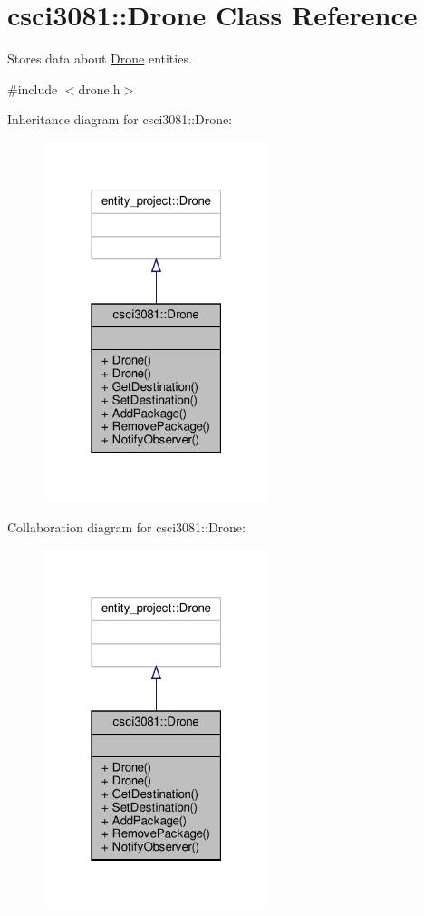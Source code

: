 \hypertarget{classcsci3081_1_1Drone}{}\section{csci3081\+:\+:Drone Class Reference}
\label{classcsci3081_1_1Drone}


Stores data about \hyperlink{classcsci3081_1_1Drone}{Drone} entities.  




{\ttfamily \#include $<$drone.\+h$>$}



Inheritance diagram for csci3081\+:\+:Drone\+:\nopagebreak
\begin{figure}[H]
\begin{center}
\leavevmode
\includegraphics[width=187pt]{classcsci3081_1_1Drone__inherit__graph}
\end{center}
\end{figure}


Collaboration diagram for csci3081\+:\+:Drone\+:\nopagebreak
\begin{figure}[H]
\begin{center}
\leavevmode
\includegraphics[width=187pt]{classcsci3081_1_1Drone__coll__graph}
\end{center}
\end{figure}
